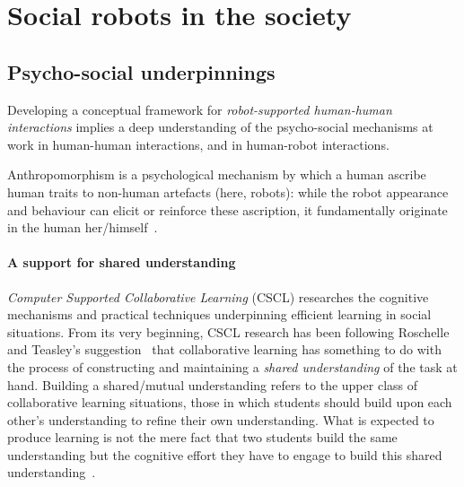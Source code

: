 \documentclass[11pt,a4paper]{report}
\begin{document}



\section{Social robots in the society}

\subsection{Psycho-social underpinnings}

Developing a conceptual framework for \emph{robot-supported human-human
interactions} implies a deep understanding of the psycho-social mechanisms at
work in human-human interactions, and in human-robot interactions.

Anthropomorphism is a psychological mechanism by which a human
ascribe human traits to non-human artefacts (here, robots): while the
robot appearance and behaviour can elicit or reinforce these ascription,
it fundamentally originate in the human her/himself~\cite{fink}.


\paragraph{A support for shared understanding}

\emph{Computer Supported Collaborative Learning} (CSCL) researches the cognitive
mechanisms and practical techniques underpinning efficient learning in social
situations. From its very beginning, CSCL research has been following
Roschelle and Teasley's suggestion~\cite{roschelle1995construction} that
collaborative learning has something to do with the process of constructing and
maintaining a \emph{shared understanding} of the task at hand. Building a shared/mutual
understanding refers to the upper class of collaborative learning situations,
those in which students should build upon each other's understanding to refine
their own understanding.  What is expected to produce learning is not the mere
fact that two students build the same understanding but the cognitive effort
they have to engage to build this shared
understanding~\cite{schwartz1995emergence}.
\end{document}
